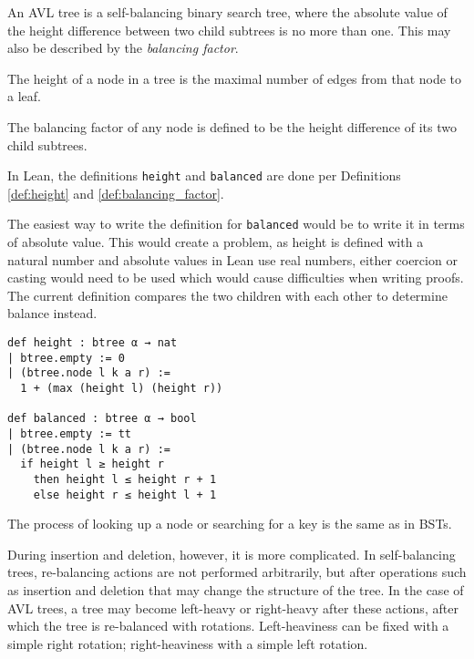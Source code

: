 An AVL tree \cite{avl:original} is a self-balancing binary search tree, where the absolute value of the height difference between two child subtrees is no more than one. 
This may also be described by the \textit{balancing factor}.

\begin{definition}
  \label{def:height}
  The height of a node in a tree is the maximal number of edges from that node to a leaf.
\end{definition}

\begin{definition}
  \label{def:balancing_factor}
  The balancing factor of any node is defined to be the height difference of its two child subtrees.
\end{definition}

In Lean, the definitions \lstinline{height} and \lstinline{balanced} are done per Definitions \ref{def:height} and \ref{def:balancing_factor}.

The easiest way to write the definition for \lstinline{balanced} would be to write it in terms of absolute value. This would create a problem, as height is defined with a natural number and absolute values in Lean use real numbers, either coercion or casting would need to be used which would cause difficulties when writing proofs. The current definition compares the two children with each other to determine balance instead. 

\begin{lstlisting}
def height : btree α → nat
| btree.empty := 0
| (btree.node l k a r) :=
  1 + (max (height l) (height r))

def balanced : btree α → bool
| btree.empty := tt
| (btree.node l k a r) :=
  if height l ≥ height r 
    then height l ≤ height r + 1
    else height r ≤ height l + 1
\end{lstlisting}

The process of looking up a node or searching for a key is the same as in BSTs. 

During insertion and deletion, however, it is more complicated. In self-balancing trees, re-balancing actions are not performed arbitrarily, but after operations such as insertion and deletion that may change the structure of the tree. In the case of AVL trees, a tree may become left-heavy or right-heavy after these actions, after which the tree is re-balanced with rotations. Left-heaviness can be fixed with a simple right rotation; right-heaviness with a simple left rotation. 

